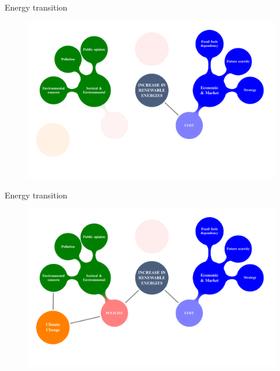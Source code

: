 \documentclass{beamer}%
\begin{document}
\begin{frame}[fragile]{Energy transition}
\begin{figure}
\centering\includegraphics[scale=0.4]{diagrama3.pdf}
\end{figure} 
\end{frame}

\begin{frame}[fragile]{Energy transition}
\begin{figure}
\centering\includegraphics[scale=0.4]{diagrama4.pdf}
\end{figure} 
\end{frame}
\end{document}
